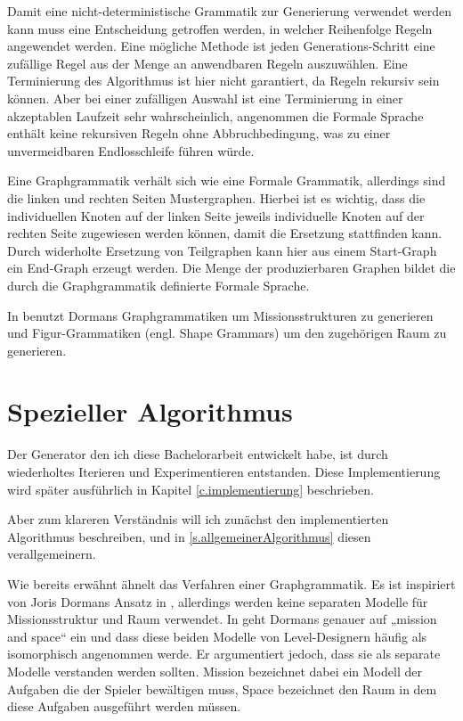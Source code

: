 Damit eine nicht-deterministische Grammatik zur Generierung verwendet werden kann muss eine Entscheidung getroffen werden, in welcher Reihenfolge Regeln angewendet werden. Eine mögliche Methode ist jeden Generations-Schritt eine zufällige Regel aus der Menge an anwendbaren Regeln auszuwählen. 
\cite[Kap.~5.2, S.~75]{shaker2016procedural}
Eine Terminierung des Algorithmus ist hier nicht garantiert, da Regeln rekursiv sein können. Aber bei einer zufälligen Auswahl ist eine Terminierung in einer akzeptablen Laufzeit sehr wahrscheinlich, angenommen die Formale Sprache enthält keine rekursiven Regeln ohne Abbruchbedingung, was zu einer unvermeidbaren Endlosschleife führen würde.

Eine Graphgrammatik verhält sich wie eine Formale Grammatik, allerdings sind die linken und rechten Seiten Mustergraphen. Hierbei ist es wichtig, dass die individuellen Knoten auf der linken Seite jeweils individuelle Knoten auf der rechten Seite zugewiesen werden können, damit die Ersetzung stattfinden kann. 
\cite[Kap.~5.5.1, S.~80]{shaker2016procedural}
Durch widerholte Ersetzung von Teilgraphen kann hier aus einem Start-Graph ein End-Graph erzeugt werden. Die Menge der produzierbaren Graphen bildet die durch die Graphgrammatik definierte Formale Sprache. 

In \cite{dormansAdventures} benutzt Dormans Graphgrammatiken um Missionsstrukturen zu generieren und Figur-Grammatiken (engl. Shape Grammars) um den zugehörigen Raum zu generieren.

\section{Spezieller Algorithmus}\label{s.speziellerAlgorithmus}

Der Generator den ich diese Bachelorarbeit entwickelt habe, ist durch wiederholtes Iterieren und Experimentieren entstanden. Diese Implementierung wird später ausführlich in Kapitel \ref{c.implementierung} beschrieben.

Aber zum klareren Verständnis will ich zunächst den implementierten Algorithmus beschreiben, und in 
\ref{s.allgemeinerAlgorithmus} diesen verallgemeinern.

Wie bereits erwähnt ähnelt das Verfahren einer Graphgrammatik. Es ist inspiriert von Joris Dormans Ansatz in 
\cite{dormansAdventures},
allerdings werden keine separaten Modelle für Missionsstruktur und Raum verwendet.
In \cite{dormansModelTransformation} geht Dormans genauer auf „mission and space“ ein und dass diese beiden Modelle von Level-Designern häufig als isomorphisch angenommen werde. Er argumentiert jedoch, dass sie als separate Modelle verstanden werden sollten. Mission bezeichnet dabei ein Modell der Aufgaben die der Spieler bewältigen muss, Space bezeichnet den Raum in dem diese Aufgaben ausgeführt werden müssen.

